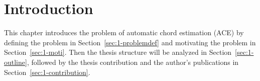 

\chapter{Introduction}\label{cp:intro}

\ifpdf
    \graphicspath{{X/figures/PNG/}{X/figures/PDF/}{X/figures/}}
\else
    \graphicspath{{X/figures/EPS/}{X/figures/}}
\fi





This chapter introduces the problem of automatic chord estimation (ACE) by defining the problem in Section~\ref{sec:1-problemdef} and motivating the problem in Section~\ref{sec:1-moti}. Then the thesis structure will be analyzed in Section~\ref{sec:1-outline}, followed by the thesis contribution and the author's publications in Section~\ref{sec:1-contribution}.

